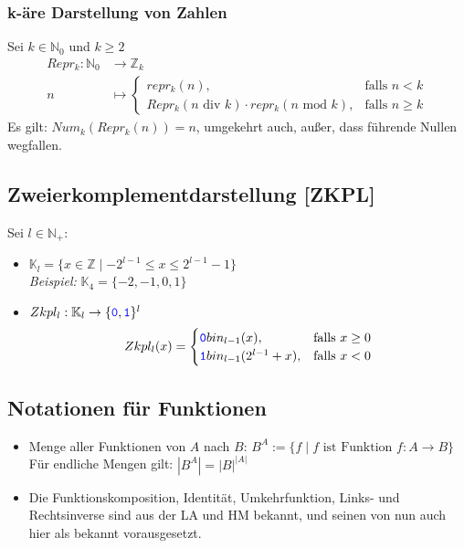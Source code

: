 \documentclass{article}
\newcommand{\N}{\mathbb{N_+}} %
\newcommand{\Nz}{{\mathbb{N}_0}} %
\newcommand{\Z}{\mathbb{Z}} %
\newcommand{\blue}[1]{\textcolor{blue}{#1}}
\newcommand{\important}[1]{\textcolor{importantColor}{#1}}
\newcommand{\example}[1]{\textit{Beispiel: }#1}
\newcommand{\word}[1]{\blue{\texttt{#1}}}
\newcommand{\set}[1]{\{#1\}}
\begin{document}
\subsubsection{k-äre Darstellung von Zahlen}
Sei $k\in\Nz$ und $k\geq2$
\begin{align*}
    Repr_k:\Nz&\to\Z_k\\
    n&\mapsto 
    \begin{cases}
        repr_k(n), &\text{falls } n<k\\
        Repr_k(n\text{ div }k)\cdot repr_k(n\text{ mod }k), &\text{falls }n\geq k
    \end{cases}
\end{align*}
Es gilt: $Num_k(Repr_k(n))=n$, umgekehrt auch, außer, dass führende Nullen wegfallen.

\subsection{Zweierkomplementdarstellung [ZKPL]}
Sei $l\in\N$:
\begin{itemize}
    \item $\mathbb{K}_l = \set{x\in\Z\mid -2^{l-1}\leq x\leq 2^{l-1}-1}$\\
    \example{$\mathbb{K}_4=\set{-2,-1,0,1}$}
    \item $Zkpl_l: \mathbb{K}_l\to\set{\word{0}, \word{1}}^l$
    \[
        Zkpl_l(x)=
        \begin{cases}
            \word{0}bin_{l-1}(x), &\text{falls }x\geq 0\\
            \word{1}bin_{l-1}(2^{l-1}+x), &\text{falls }x<0
        \end{cases}
    \]
\end{itemize}

\subsection{Notationen für Funktionen}
\begin{itemize}
    \item Menge aller Funktionen von $A$ nach $B$: \important{$B^A:=\set{f\mid f \text{ ist Funktion } f:A\to B}$}\\
    Für endliche Mengen gilt: $|B^A|=|B|^{|A|}$
    \item Die Funktionskomposition, Identität, Umkehrfunktion, Links- und Rechtsinverse sind aus der LA und HM bekannt, und seinen von nun auch hier als bekannt vorausgesetzt.
\end{itemize}
\end{document}
